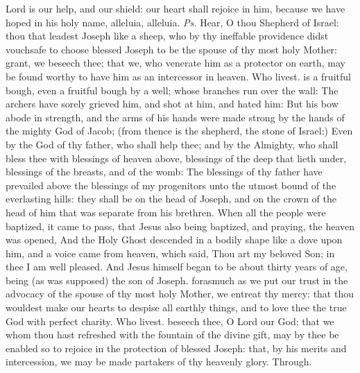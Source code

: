 \introit
{} Lord is our help, and our shield: our heart shall rejoice in him, because we have hoped in his holy name, alleluia, alleluia. \textit{Ps.} Hear, O thou Shepherd of Israel: thou that leadest Joseph like a sheep,
\collect
{} who by thy ineffable providence didst vouchsafe to choose blessed Joseph to be the spouse of thy most holy Mother: grant, we beseech thee; that we, who venerate him as a protector on earth, may be found worthy to have him as an intercessor in heaven. Who livest.
 is a fruitful bough, even a fruitful bough by a well; whose branches run over the wall: The archers have sorely grieved him, and shot at him, and hated him: But his bow abode in strength, and the arms of his hands were made strong by the hands of the mighty God of Jacob; (from thence is the shepherd, the stone of Israel:) Even by the God of thy father, who shall help thee; and by the Almighty, who shall bless thee with blessings of heaven above, blessings of the deep that lieth under, blessings of the breasts, and of the womb: The blessings of thy father have prevailed above the blessings of my progenitors unto the utmost bound of the everlasting hills: they shall be on the head of Joseph, and on the crown of the head of him that was separate from his brethren.
 When all the people were baptized, it came to pass, that Jesus also being baptized, and praying, the heaven was opened, And the Holy Ghost descended in a bodily shape like a dove upon him, and a voice came from heaven, which said, Thou art my beloved Son; in thee I am well pleased. And Jesus himself began to be about thirty years of age, being (as was supposed) the son of Joseph.
\secret
{} forasmuch as we put our trust in the advocacy of the spouse of thy most holy Mother, we entreat thy mercy: that thou wouldest make our hearts to despise all earthly things, and to love thee the true God with perfect charity. Who livest.
\postcommunion
{} beseech thee, O Lord our God: that we whom thou hast refreshed with the fountain of the divine gift, may by thee be enabled so to rejoice in the protection of blessed Joseph: that, by his merits and intercession, we may be made partakers of thy heavenly glory. Through.


